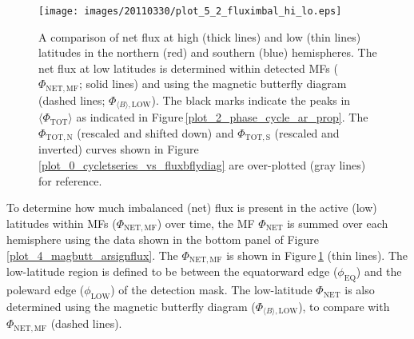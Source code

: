 \documentclass[namedreferences]{solarphysics}
\makeatletter
\def\ScaleIfNeeded{%
\ifdim\Gin@nat@width>\linewidth
\linewidth
\else
\Gin@nat@width
\fi
}
\makeatother
\begin{document}
\begin{article}
\begin{figure}[!ht]
\begin{center}
\texttt{[image: images/20110330/plot\_5\_2\_fluximbal\_hi\_lo.eps]}
\end{center}
\caption{A comparison of net flux at high (thick lines) and low (thin lines) latitudes in the northern (red) and southern (blue) hemispheres. The net flux at low latitudes is determined within detected MFs ($\Phi_{\mathrm{NET,MF}}$; solid lines) and using the magnetic butterfly diagram (dashed lines; $\Phi_{\langle B \rangle,\mathrm{LOW}}$). The black marks indicate the peaks in $\langle\Phi_\mathrm{TOT}\rangle$ as indicated in Figure\,\ref{plot_2_phase_cycle_ar_prop}. The $\Phi_{\mathrm{TOT,N}}$ (rescaled and shifted down) and $\Phi_{\mathrm{TOT,S}}$ (rescaled and inverted) curves shown in Figure \ref{plot_0_cycletseries_vs_fluxbflydiag} are over-plotted (gray lines) for reference.
}
\label{plot_5_fluximbal_hi_lo}
\end{figure}

To determine how much imbalanced (net) flux is present in the active (low) latitudes within MFs ($\Phi_{\mathrm{NET,MF}}$) over time, the MF $\Phi_{\mathrm{NET}}$ is summed over each hemisphere using the data shown in the bottom panel of Figure\,\ref{plot_4_magbutt_arsignflux}. The $\Phi_{\mathrm{NET,MF}}$ is shown in Figure\,\ref{plot_5_fluximbal_hi_lo} (thin lines). The low-latitude region is defined to be between the equatorward edge ($\phi_\mathrm{EQ}$) and the poleward edge ($\phi_\mathrm{LOW}$) of the detection mask. The low-latitude $\Phi_{\mathrm{NET}}$ is also determined using the magnetic butterfly diagram ($\Phi_{\langle B \rangle,\mathrm{LOW}}$), to compare with $\Phi_{\mathrm{NET,MF}}$ (dashed lines). 


\end{article}
\end{document}
